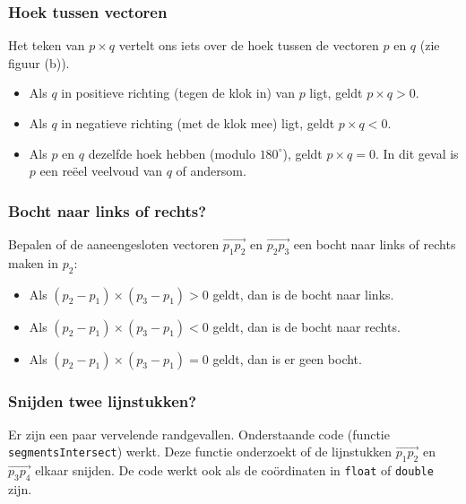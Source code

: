 \documentclass[10pt,a4paper,titlepage]{article}
\begin{document}
\subsubsection{Hoek tussen vectoren}
Het teken van $p\times q$ vertelt ons iets over de hoek tussen de vectoren $p$ en $q$ (zie figuur (b)).
\begin{itemize}[noitemsep,nolistsep]
	\item Als $q$ in positieve richting (tegen de klok in) van $p$ ligt, geldt $p\times q > 0$.
	\item Als $q$ in negatieve richting (met de klok mee) ligt, geldt $p\times q < 0$.
	\item Als $p$ en $q$ dezelfde hoek hebben (modulo $180^\circ$), geldt $p\times q = 0$. In dit geval is $p$ een re\"eel veelvoud van $q$ of andersom.
\end{itemize}

\subsubsection{Bocht naar links of rechts?}

Bepalen of de aaneengesloten vectoren $\overrightarrow{p_1p_2}$ en $\overrightarrow{p_2p_3}$ een bocht naar links of rechts maken in $p_2$:
\begin{itemize}[noitemsep,nolistsep]
	\item Als $(p_2 - p_1)\times (p_3 - p_1) > 0$ geldt, dan is de bocht naar links.
	\item Als $(p_2 - p_1)\times (p_3 - p_1) < 0$ geldt, dan is de bocht naar rechts.
	\item Als $(p_2 - p_1)\times (p_3 - p_1) = 0$ geldt, dan is er geen bocht.
\end{itemize}

\fi

\subsubsection{Snijden twee lijnstukken?}
Er zijn een paar vervelende randgevallen. Onderstaande code (functie \texttt{segmentsIntersect}) werkt. Deze functie onderzoekt of de lijnstukken $\overrightarrow{p_1p_2}$ en $\overrightarrow{p_3p_4}$ elkaar snijden. De code werkt ook als de co\"ordinaten in \texttt{float} of \texttt{double} zijn.



\end{document}
